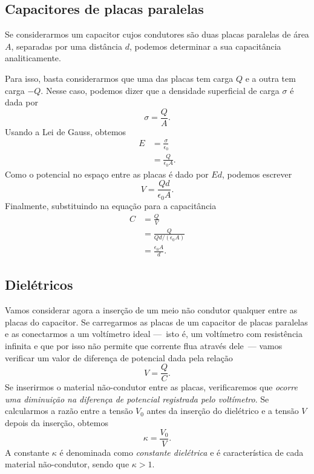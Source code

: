 \subsection{Capacitores de placas paralelas}

Se considerarmos um capacitor cujos condutores são duas placas paralelas de área $A$, separadas por uma distância $d$, podemos determinar a sua capacitância analiticamente.

Para isso, basta considerarmos que uma das placas tem carga $Q$ e a outra tem carga $-Q$. Nesse caso, podemos dizer que a densidade superficial de carga $\sigma$ é dada por
\begin{equation}
	\sigma = \frac{Q}{A}.
\end{equation}
%
Usando a Lei de Gauss, obtemos
\begin{align}
	E &= \frac{\sigma}{\epsilon_0} \\
	&= \frac{Q}{\epsilon_0 A}.
\end{align}
%
Como o potencial no espaço entre as placas é dado por $Ed$, podemos escrever
\begin{equation}
	V = \frac{Qd}{\epsilon_0 A}.
\end{equation}
%
Finalmente, substituindo na equação para a capacitância
\begin{align}
	C &= \frac{Q}{V} \\
	&= \frac{Q}{Qd/(\epsilon_0 A)} \\
	&= \frac{\epsilon_0 A}{d}.
\end{align}

\subsection{Dielétricos}

Vamos considerar agora a inserção de um meio não condutor qualquer entre as placas do capacitor. Se carregarmos as placas de um capacitor de placas paralelas e as conectarmos a um voltímetro ideal ---~isto é, um voltímetro com resistência infinita e que por isso não permite que corrente flua através dele~--- vamos verificar um valor de diferença de potencial dada pela relação
\begin{equation}
    V = \frac{Q}{C}.
\end{equation}
%
Se inserirmos o material não-condutor entre as placas, verificaremos que \emph{ocorre uma diminuição na diferença de potencial registrada pelo voltímetro}. Se calcularmos a razão entre a tensão $V_0$ antes da inserção do dielétrico e a tensão $V$ depois da inserção, obtemos
\begin{equation}
    \kappa = \frac{V_0}{V}.
\end{equation}
%
A constante $\kappa$ é denominada como \emph{constante dielétrica} e é característica de cada material não-condutor, sendo que $\kappa > 1$.

